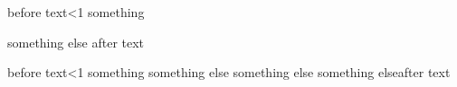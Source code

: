 before text\ifodd\x<1 something

\or something else \fi  after text

before text\ifodd\x<1 something
\or something else
\or something else
\or something else\fi after text
